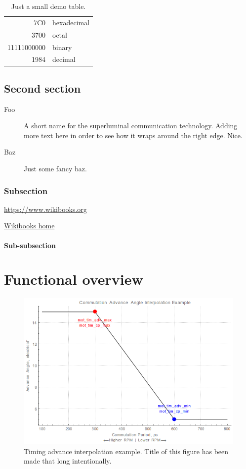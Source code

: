 \documentclass[a4paper,onecolumn,openany]{book}
\begin{document}
\begin{table}[hb]
    \centering
	\begin{tabular}{|r|l|}
		\hline
		7C0 & hexadecimal \\
		3700 & octal \\ \cline{2-2}
		11111000000 & binary \\
		\hline \hline
		1984 & decimal \\
		\hline
	\end{tabular}
	\caption{Just a small demo table.}
\end{table}

\section{Second section}
\begin{description}
\item[Foo] A short name for the superluminal communication technology.
Adding more text here in order to see how it wraps around the right edge. Nice.
\item[Baz] Just some fancy baz.
\end{description}

\subsection{Subsection}

\url{https://www.wikibooks.org}

\href{https://www.wikibooks.org}{Wikibooks home}

\subsubsection{Sub-subsection}

\lipsum[5]

\chapter{Functional overview}

\begin{figure}
  \includegraphics[width=\textwidth]{timing_advance_interpolation}
  \caption{Timing advance interpolation example. Title of this figure has been made that long intentionally.}
\end{figure}
\end{document}
